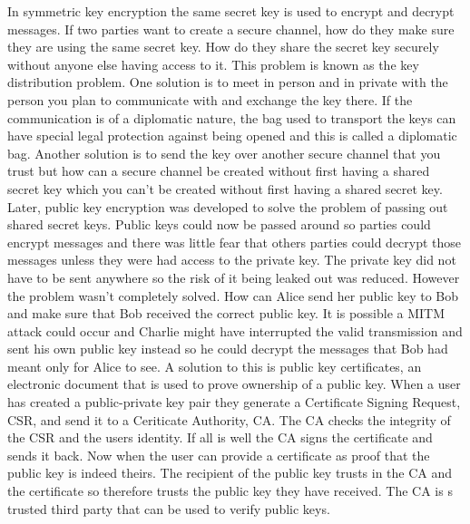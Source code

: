 In symmetric key encryption the same secret key is used to encrypt and decrypt messages. If two parties want to create a secure channel, how do they make sure they are using the same secret key. How do they share the secret key securely without anyone else having access to it. This problem is known as the key distribution problem. One solution is to meet in person and in private with the person you plan to communicate with and exchange the key there. If the communication is of a diplomatic nature, the bag used to transport the keys can have special legal protection against being opened and this is called a diplomatic bag\cite{dipbag}. Another solution is to send the key over another secure channel that you trust but how can a secure channel be created without first having a shared secret key which you can't be created without first having a shared secret key. Later, public key encryption was developed to solve the problem of passing out shared secret keys. Public keys could now be passed around so parties could encrypt messages and there was little fear that others parties could decrypt those messages unless they were had access to the private key. The private key did not have to be sent anywhere so the risk of it being leaked out was reduced. However the problem wasn't completely solved. How can Alice send her public key to Bob and make sure that Bob received the correct public key. It is possible a MITM attack could occur and Charlie might have interrupted the valid transmission and sent his own public key instead so he could decrypt the messages that Bob had meant only for Alice to see. A solution to this is public key certificates, an electronic document that is used to prove ownership of a public key.  When a user has created a public-private key pair they generate a Certificate Signing Request, CSR, and send it to a Ceriticate Authority, CA. The CA checks the integrity of the CSR and the users identity. If all is well the CA signs the certificate and sends it back. Now when the user can provide a certificate as proof that the public key is indeed theirs. The recipient of the public key trusts in the CA and the certificate so therefore trusts the public key they have received. The CA is s trusted third party that can be used to verify public keys.
